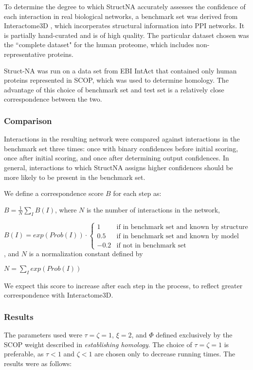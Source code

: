 \documentclass[12pt,twoside]{article}
\begin{document}
To determine the degree to which StructNA accurately assesses the confidence of each interaction in real biological networks, a benchmark set was derived from Interactome3D \cite{interactome3d}, which incorperates structural information into PPI networks. It is partially hand-curated and is of high quality. The particular dataset chosen was the ``complete dataset" for the human proteome, which includes non-representative proteins.

Struct-NA was run on a data set from EBI IntAct \cite{intact} that contained only human proteins represented  in SCOP, which was used to determine homology. The advantage of this choice of benchmark set and test set is a relatively close correspondence between the two.

\subsubsection{Comparison}

Interactions in the resulting network were compared against interactions in the benchmark set three times: once with binary confidences before initial scoring, once after initial scoring, and once after determining output confidences. In general, interactions to which StructNA assigns higher confidences should be more likely to be present in the benchmark set.

We define a correspondence score $B$ for each step as:

$B = \displaystyle \frac{1}{N} \sum_I B(I)$, where $N$ is the number of interactions in the network,

$B(I) = exp(Prob(I)) \cdot \left\{
\begin{array}{ll}
1 & \text{if in benchmark set and known by structure}\\
0.5 & \text{if in benchmark set and known by model}\\
-0.2 & \text{if not in benchmark set}
\end{array} \right.$,
and $N$ is a normalization constant defined by

$N = \displaystyle \sum_I exp(Prob(I))$
 
We expect this score to increase after each step in the process, to reflect greater correspondence with Interactome3D.

\subsubsection{Results}

The parameters used were $\tau = \zeta = 1$, $\xi=2$, and $\Phi$ defined exclusively by the SCOP weight described in \emph{establishing homology}. The choice of $\tau = \zeta = 1$ is preferable, as $\tau < 1$ and $\zeta < 1$ are chosen only to decrease running times. The results were as follows:
\end{document}
